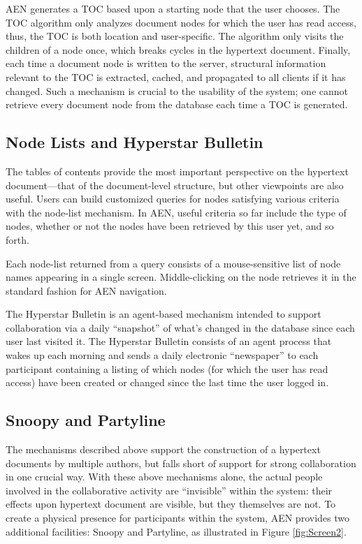 AEN generates a TOC based upon a starting node that the user chooses.
The TOC algorithm only analyzes document nodes for which the user has
read access, thus, the TOC is both location and user-specific.  The
algorithm only visits the children of a node once, which breaks cycles
in the hypertext document. Finally, each time a document node is written 
to the server, structural information 
relevant to the TOC is extracted, cached, and propagated to all
clients if it has changed. Such a mechanism is crucial to the 
usability of the system; one cannot retrieve every document node
from the database each time a TOC is generated.


\subsection{Node Lists and Hyperstar Bulletin}

The tables of contents provide the most important perspective on the
hypertext document---that of the document-level structure, but other viewpoints
are also useful.  Users can build customized queries for nodes
satisfying various criteria with the node-list mechanism. In AEN,
useful criteria so far include the type of nodes, whether or not the
nodes have been retrieved by this user yet, and so forth.

Each node-list returned from a query consists of a mouse-sensitive
list of node names appearing in a single screen. Middle-clicking
on the node retrieves it in the standard fashion for AEN navigation.

The Hyperstar Bulletin is an agent-based
mechanism intended to support collaboration via a daily ``snapshot'' of
what's changed in the database since each user last visited it.  The
Hyperstar Bulletin consists of an agent process that wakes up each morning
and sends a daily electronic ``newspaper'' to each participant containing a
listing of which nodes (for which the user has read access) have been
created or changed since the last time the user logged in.

\subsection{Snoopy and Partyline}

The mechanisms described above support the construction of a hypertext documents by
multiple authors, but falls short of support for strong collaboration in
one crucial way.  With these above mechanisms alone, the actual people
involved in the collaborative activity are ``invisible'' within the system:
their effects upon hypertext document are visible, but they themselves are
not.  To create a physical presence for participants within the system, AEN
provides two additional facilities: Snoopy and Partyline, as illustrated in
Figure \ref{fig:Screen2}.

